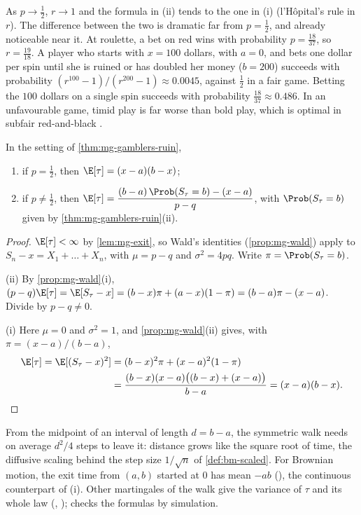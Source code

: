 As $p\to\frac12$, $r\to1$ and the formula in (ii) tends to the one in (i) (l'H\^opital's rule
in $r$). The difference between the two is dramatic far from $p=\frac12$, and already
noticeable near it. At roulette, a bet on red wins with probability $p=\frac{18}{37}$, so
$r=\frac{19}{18}$. A player who starts with $x=100$ dollars, with $a=0$, and bets one dollar per
spin until she is ruined or has doubled her money ($b=200$) succeeds with probability
$(r^{100}-1)/(r^{200}-1)\approx0.0045$, against $\frac12$ in a fair game. Betting the $100$
dollars on a single spin succeeds with probability $\frac{18}{37}\approx0.486$. In an
unfavourable game, timid play is far worse than bold play, which is optimal in subfair
red-and-black \citep{dubins-savage}.

\begin{proposition}\label{prop:mg-duration}
In the setting of \cref{thm:mg-gamblers-ruin},
\begin{enumerate}[label=(\roman*)]
  \item if $p=\frac12$, then $\E[\tau]=(x-a)(b-x)$;
  \item if $p\ne\frac12$, then $\displaystyle\E[\tau]=\frac{(b-a)\,\Prob(S_\tau=b)-(x-a)}{p-q}$,
    with $\Prob(S_\tau=b)$ given by \cref{thm:mg-gamblers-ruin}(ii).
\end{enumerate}
\end{proposition}

\begin{proof}
$\E[\tau]<\infty$ by \cref{lem:mg-exit}, so Wald's identities (\cref{prop:mg-wald}) apply to
$S_n-x=X_1+\dots+X_n$, with $\mu=p-q$ and $\sigma^2=4pq$. Write $\pi=\Prob(S_\tau=b)$.

(ii) By \cref{prop:mg-wald}(i),
$(p-q)\E[\tau]=\E[S_\tau-x]=(b-x)\pi+(a-x)(1-\pi)=(b-a)\pi-(x-a)$. Divide by $p-q\ne0$.

(i) Here $\mu=0$ and $\sigma^2=1$, and \cref{prop:mg-wald}(ii) gives, with $\pi=(x-a)/(b-a)$,
\begin{align*}
  \E[\tau]=\E[(S_\tau-x)^2]&=(b-x)^2\pi+(x-a)^2(1-\pi)\\
  &=\frac{(b-x)(x-a)\big((b-x)+(x-a)\big)}{b-a}=(x-a)(b-x).\qedhere
\end{align*}
\end{proof}

From the midpoint of an interval of length $d=b-a$, the symmetric walk needs on average
$d^2/4$ steps to leave it: distance grows like the square root of time, the diffusive scaling
behind the step size $1/\sqrt n$ of \cref{def:bm-scaled}. For Brownian motion, the exit time
from $(a,b)$ started at $0$ has mean $-ab$ (), the continuous counterpart of
(i). Other martingales of the walk give the variance of $\tau$ and its whole law
(, );  checks the formulas by
simulation.

